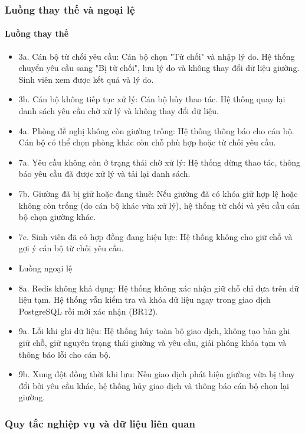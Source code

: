\subsubsection{Luồng thay thế và ngoại lệ}

\paragraph{Luồng thay thế}

\begin{itemize}[leftmargin=1.4em]
\item 3a. Cán bộ từ chối yêu cầu: Cán bộ chọn "Từ chối" và nhập lý do. Hệ thống chuyển yêu cầu sang "Bị từ chối", lưu lý do và không thay đổi dữ liệu giường. Sinh viên xem được kết quả và lý do.
\item 3b. Cán bộ không tiếp tục xử lý: Cán bộ hủy thao tác. Hệ thống quay lại danh sách yêu cầu chờ xử lý và không thay đổi dữ liệu.
\item 4a. Phòng đề nghị không còn giường trống: Hệ thống thông báo cho cán bộ. Cán bộ có thể chọn phòng khác còn chỗ phù hợp hoặc từ chối yêu cầu.
\item 7a. Yêu cầu không còn ở trạng thái chờ xử lý: Hệ thống dừng thao tác, thông báo yêu cầu đã được xử lý và tải lại danh sách.
\item 7b. Giường đã bị giữ hoặc đang thuê: Nếu giường đã có khóa giữ hợp lệ hoặc không còn trống (do cán bộ khác vừa xử lý), hệ thống từ chối và yêu cầu cán bộ chọn giường khác.
\item 7c. Sinh viên đã có hợp đồng đang hiệu lực: Hệ thống không cho giữ chỗ và gợi ý cán bộ từ chối yêu cầu.
\item Luồng ngoại lệ
\item 8a. Redis không khả dụng: Hệ thống không xác nhận giữ chỗ chỉ dựa trên dữ liệu tạm. Hệ thống vẫn kiểm tra và khóa dữ liệu ngay trong giao dịch PostgreSQL rồi mới xác nhận (BR12).
\item 9a. Lỗi khi ghi dữ liệu: Hệ thống hủy toàn bộ giao dịch, không tạo bản ghi giữ chỗ, giữ nguyên trạng thái giường và yêu cầu, giải phóng khóa tạm và thông báo lỗi cho cán bộ.
\item 9b. Xung đột đồng thời khi lưu: Nếu giao dịch phát hiện giường vừa bị thay đổi bởi yêu cầu khác, hệ thống hủy giao dịch và thông báo cán bộ chọn lại giường.
\end{itemize}

\subsubsection{Quy tắc nghiệp vụ và dữ liệu liên quan}

